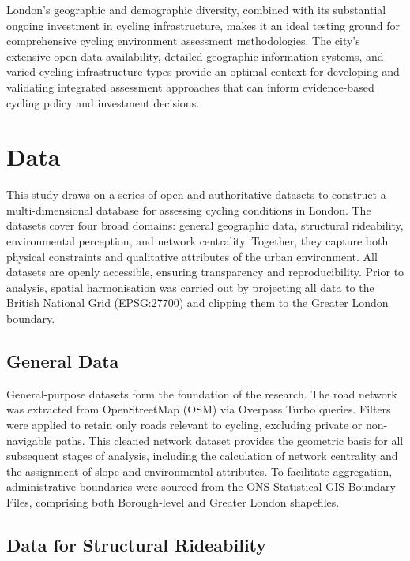 \documentclass[
  12pt,
  oneside]{book}
\begin{document}
London's geographic and demographic diversity, combined with its substantial ongoing investment in cycling infrastructure, makes it an ideal testing ground for comprehensive cycling environment assessment methodologies. The city's extensive open data availability, detailed geographic information systems, and varied cycling infrastructure types provide an optimal context for developing and validating integrated assessment approaches that can inform evidence-based cycling policy and investment decisions.

\section{Data}\label{data}

This study draws on a series of open and authoritative datasets to construct a multi-dimensional database for assessing cycling conditions in London. The datasets cover four broad domains: general geographic data, structural rideability, environmental perception, and network centrality. Together, they capture both physical constraints and qualitative attributes of the urban environment. All datasets are openly accessible, ensuring transparency and reproducibility. Prior to analysis, spatial harmonisation was carried out by projecting all data to the British National Grid (EPSG:27700) and clipping them to the Greater London boundary.

\subsection{General Data}\label{general-data}

General-purpose datasets form the foundation of the research. The road network was extracted from OpenStreetMap (OSM) via Overpass Turbo queries. Filters were applied to retain only roads relevant to cycling, excluding private or non-navigable paths. This cleaned network dataset provides the geometric basis for all subsequent stages of analysis, including the calculation of network centrality and the assignment of slope and environmental attributes. To facilitate aggregation, administrative boundaries were sourced from the ONS Statistical GIS Boundary Files, comprising both Borough-level and Greater London shapefiles.

\subsection{Data for Structural Rideability}\label{data-for-structural-rideability}
\end{document}
